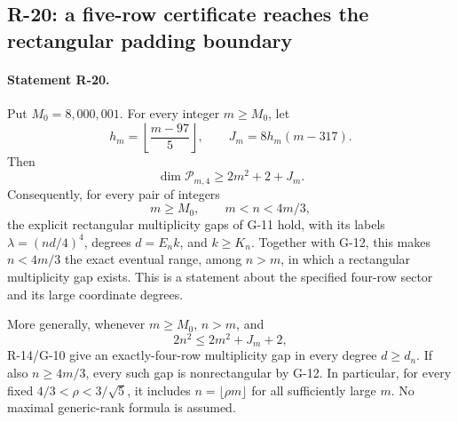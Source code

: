 \subsection{R-20: a five-row certificate reaches the rectangular padding boundary}

\paragraph{Statement R-20.}
Put $M_0=8{,}000{,}001$. For every integer $m\geq M_0$, let
\[
 h_m=\left\lfloor\frac{m-97}{5}\right\rfloor,
 \qquad J_m=8h_m(m-317).
\]
Then
\begin{equation}\label{R20:dimension}
 \dim\mathcal P_{m,4}\geq2m^2+2+J_m.
\end{equation}
Consequently, for every pair of integers
\begin{equation}\label{R20:rectrange}
 m\geq M_0,\qquad m<n<4m/3,
\end{equation}
the explicit rectangular multiplicity gaps of G-11 hold, with its
labels $\lambda=(nd/4)^4$, degrees $d=E_nk$, and $k\geq K_n$.
Together with G-12, this makes $n<4m/3$ the exact eventual range,
among $n>m$, in which a rectangular multiplicity gap exists.
This is a statement about the specified four-row sector and its
large coordinate degrees.

More generally, whenever $m\geq M_0$, $n>m$, and
\begin{equation}\label{R20:allrange}
 2n^2\leq2m^2+J_m+2,
\end{equation}
R-14/G-10 give an exactly-four-row multiplicity gap in every degree
$d\geq d_n$. If also $n\geq4m/3$, every such gap is nonrectangular
by G-12. In particular, for every fixed $4/3<\rho<3/\sqrt5$, it includes
$n=\lfloor\rho m\rfloor$ for all sufficiently large $m$.
No maximal generic-rank formula is assumed.

